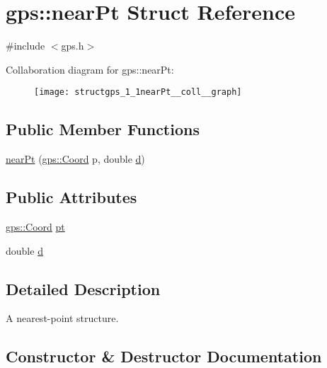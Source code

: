 \hypertarget{structgps_1_1nearPt}{}\section{gps\+:\+:near\+Pt Struct Reference}
\label{structgps_1_1nearPt}


{\ttfamily \#include $<$gps.\+h$>$}



Collaboration diagram for gps\+:\+:near\+Pt\+:\nopagebreak
\begin{figure}[H]
\begin{center}
\leavevmode
\texttt{[image: structgps\_1\_1nearPt\_\_coll\_\_graph]}
\end{center}
\end{figure}
\subsection*{Public Member Functions}
\begin{DoxyCompactItemize}
\item 
\hyperlink{structgps_1_1nearPt_a2a719f92056ca65f9cb7047970e2cf47}{near\+Pt} (\hyperlink{classgps_1_1Coord}{gps\+::\+Coord} p, double \hyperlink{structgps_1_1nearPt_a82eeb1e4d61f5df14e20565b2f6da32e}{d})
\end{DoxyCompactItemize}
\subsection*{Public Attributes}
\begin{DoxyCompactItemize}
\item 
\hyperlink{classgps_1_1Coord}{gps\+::\+Coord} \hyperlink{structgps_1_1nearPt_ab6d2b7e5d5e67891cd83bf2d5ae3ecb9}{pt}
\item 
double \hyperlink{structgps_1_1nearPt_a82eeb1e4d61f5df14e20565b2f6da32e}{d}
\end{DoxyCompactItemize}


\subsection{Detailed Description}
A nearest-\/point structure. 

\subsection{Constructor \& Destructor Documentation}
